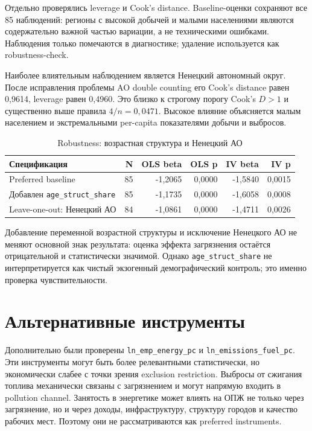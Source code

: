 \documentclass[11pt,a4paper]{article}
\begin{document}
Отдельно проверялись leverage и Cook's distance. Baseline-оценки сохраняют все 85 наблюдений: регионы с высокой добычей и малыми населениями являются содержательно важной частью вариации, а не техническими ошибками. Наблюдения только помечаются в диагностике; удаление используется как robustness-check.

Наиболее влиятельным наблюдением является Ненецкий автономный округ. После исправления проблемы AO double counting его Cook's distance равен 0{,}9614, leverage равен 0{,}4960. Это близко к строгому порогу Cook's $D>1$ и существенно выше правила $4/n=0{,}0471$. Высокое влияние объясняется малым населением и экстремальными per-capita показателями добычи и выбросов.

\begin{table}[H]
\centering
\caption{Robustness: возрастная структура и Ненецкий АО}
\label{tab:robust_age}
\begin{tabular}{lrrrrr}
\toprule
\textbf{Спецификация} & \textbf{N} & \textbf{OLS beta} & \textbf{OLS p} & \textbf{IV beta} & \textbf{IV p} \\
\midrule
Preferred baseline & 85 & -1{,}2065 & 0{,}0000 & -1{,}5840 & 0{,}0015 \\
Добавлен \texttt{age\_struct\_share} & 85 & -1{,}1735 & 0{,}0000 & -1{,}6058 & 0{,}0008 \\
Leave-one-out: Ненецкий АО & 84 & -1{,}0861 & 0{,}0000 & -1{,}4711 & 0{,}0026 \\
\bottomrule
\end{tabular}
\end{table}

Добавление переменной возрастной структуры и исключение Ненецкого АО не меняют основной знак результата: оценка эффекта загрязнения остаётся отрицательной и статистически значимой. Однако \texttt{age\_struct\_share} не интерпретируется как чистый экзогенный демографический контроль; это именно проверка чувствительности.

\section{Альтернативные инструменты}

Дополнительно были проверены \texttt{ln\_emp\_energy\_pc} и \texttt{ln\_emissions\_fuel\_pc}. Эти инструменты могут быть более релевантными статистически, но экономически слабее с точки зрения exclusion restriction. Выбросы от сжигания топлива механически связаны с загрязнением и могут напрямую входить в pollution channel. Занятость в энергетике может влиять на ОПЖ не только через загрязнение, но и через доходы, инфраструктуру, структуру городов и качество рабочих мест. Поэтому они не рассматриваются как preferred instruments.
\end{document}
